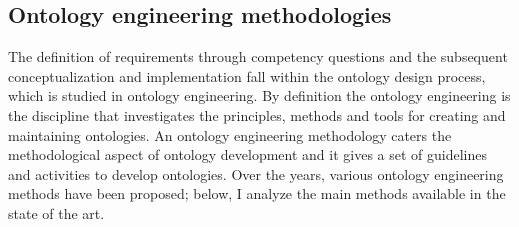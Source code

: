 \subsection{Ontology engineering methodologies}
The definition of requirements through competency questions and the subsequent conceptualization and implementation fall within the ontology design process, which is studied in ontology engineering. By definition the ontology engineering  is the discipline that investigates the principles, methods and tools for creating and maintaining ontologies. An ontology engineering methodology caters the methodological aspect of ontology development and it gives a set of guidelines and activities to develop ontologies.\cite{iqbal2013analysis}
Over the years, various ontology engineering methods have been proposed; below, I analyze the main methods available in the state of the art.


